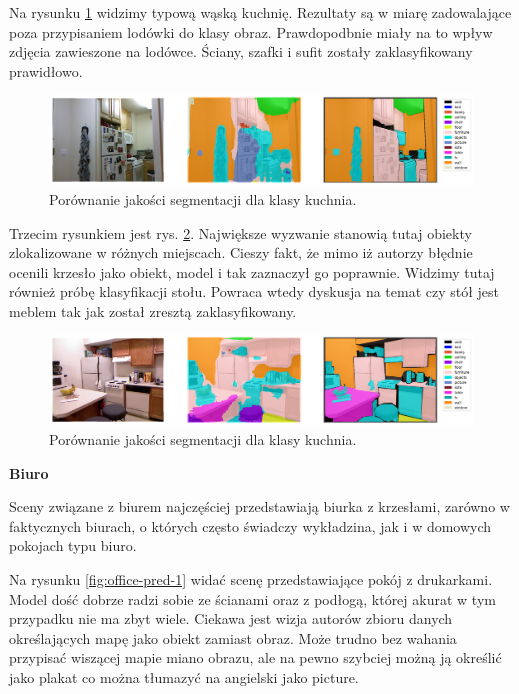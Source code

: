 Na rysunku \ref{fig:kitchen-pred-2} widzimy typową wąską kuchnię. Rezultaty są w miarę zadowalające poza przypisaniem lodówki do klasy obraz. Prawdopodbnie miały na to wpływ zdjęcia zawieszone na lodówce. Ściany, szafki i sufit zostały zaklasyfikowany prawidłowo.

\begin{figure}[ht!]
    \centering
    \includegraphics[width=\textwidth]{img/preds_analysis/gt_vs_pred/kitchen-2.png}
    \caption{Porównanie jakości segmentacji dla klasy kuchnia.}
    \label{fig:kitchen-pred-2}
\end{figure}

Trzecim rysunkiem jest rys. \ref{fig:kitchen-pred-3}. Największe wyzwanie stanowią tutaj obiekty zlokalizowane w różnych miejscach. Cieszy fakt, że mimo iż autorzy błędnie ocenili krzesło jako obiekt, model i tak zaznaczył go poprawnie. Widzimy tutaj również próbę klasyfikacji stołu. Powraca wtedy dyskusja na temat czy stół jest meblem tak jak został zresztą zaklasyfikowany.

\begin{figure}[ht!]
    \centering
    \includegraphics[width=\textwidth]{img/preds_analysis/gt_vs_pred/kitchen-3.png}
    \caption{Porównanie jakości segmentacji dla klasy kuchnia.}
    \label{fig:kitchen-pred-3}
\end{figure}

\noindent
\textbf{Biuro}

Sceny związane z biurem najczęściej przedstawiają biurka z krzesłami, zarówno w faktycznych biurach, o których często świadczy wykładzina, jak i w domowych pokojach typu biuro.

Na rysunku \ref{fig:office-pred-1} widać scenę przedstawiające pokój z drukarkami. Model dość dobrze radzi sobie ze ścianami oraz z podłogą, której akurat w tym przypadku nie ma zbyt wiele. Ciekawa jest wizja autorów zbioru danych określających mapę jako obiekt zamiast obraz. Może trudno bez wahania przypisać wiszącej mapie miano obrazu, ale na pewno szybciej możną ją określić jako plakat co można tłumazyć na angielski jako picture.

